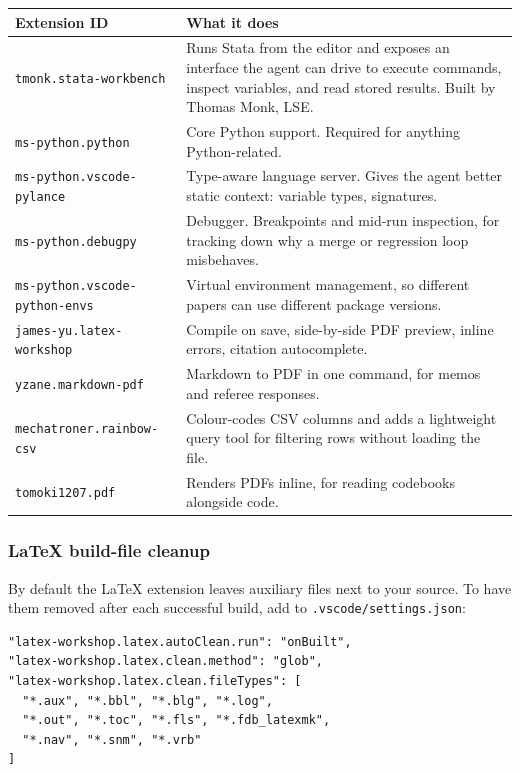 \documentclass[11pt,a4paper]{article}
\newcommand{\code}[1]{\texttt{\small #1}}
\begin{document}
\begin{longtable}{@{}p{5.4cm}p{7.6cm}@{}}
\toprule
\textbf{Extension ID} & \textbf{What it does} \\
\midrule
\endhead
\code{tmonk.stata-workbench} &
Runs Stata from the editor and exposes an interface the agent can drive to
execute commands, inspect variables, and read stored results. Built by Thomas
Monk, LSE. \\
\addlinespace
\code{ms-python.python} & Core Python support. Required for anything
Python-related. \\
\code{ms-python.vscode-pylance} & Type-aware language server. Gives the agent
better static context: variable types, signatures. \\
\code{ms-python.debugpy} & Debugger. Breakpoints and mid-run inspection, for
tracking down why a merge or regression loop misbehaves. \\
\code{ms-python.vscode-python-envs} & Virtual environment management, so
different papers can use different package versions. \\
\addlinespace
\code{james-yu.latex-workshop} & Compile on save, side-by-side PDF preview,
inline errors, citation autocomplete. \\
\code{yzane.markdown-pdf} & Markdown to PDF in one command, for memos and referee
responses. \\
\addlinespace
\code{mechatroner.rainbow-csv} & Colour-codes CSV columns and adds a lightweight
query tool for filtering rows without loading the file. \\
\code{tomoki1207.pdf} & Renders PDFs inline, for reading codebooks alongside
code. \\
\bottomrule
\end{longtable}

\subsubsection{LaTeX build-file cleanup}

By default the LaTeX extension leaves auxiliary files next to your source. To
have them removed after each successful build, add to \code{.vscode/settings.json}:

\begin{promptbox}
\begin{Verbatim}[breaklines,fontsize=\footnotesize]
"latex-workshop.latex.autoClean.run": "onBuilt",
"latex-workshop.latex.clean.method": "glob",
"latex-workshop.latex.clean.fileTypes": [
  "*.aux", "*.bbl", "*.blg", "*.log",
  "*.out", "*.toc", "*.fls", "*.fdb_latexmk",
  "*.nav", "*.snm", "*.vrb"
]
\end{Verbatim}
\end{promptbox}
\end{document}
